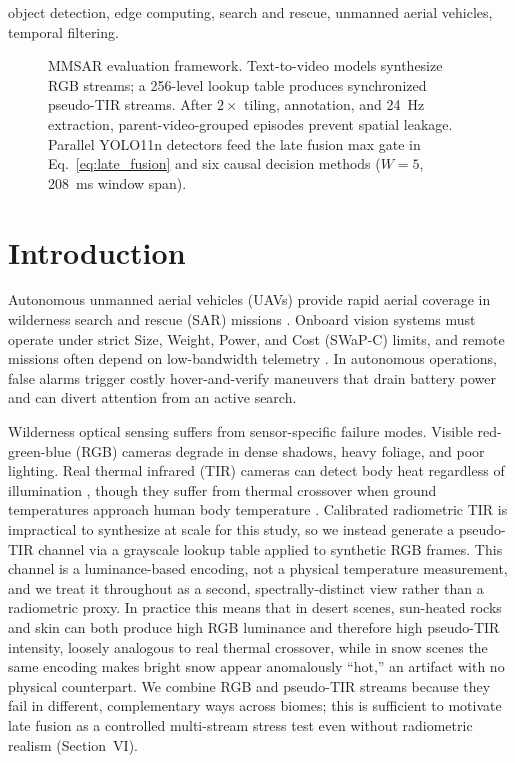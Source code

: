 \documentclass[conference]{IEEEtran}
\begin{document}
\begin{IEEEkeywords}
object detection, edge computing, search and rescue, unmanned aerial vehicles, temporal filtering.
\end{IEEEkeywords}

\begin{figure}[!t]
\centering
\resizebox{1.0\textwidth}{!}{}
\caption{MMSAR evaluation framework. Text-to-video models synthesize RGB streams; a 256-level lookup table produces synchronized pseudo-TIR streams. After $2\times$ tiling, annotation, and 24~Hz extraction, parent-video-grouped episodes prevent spatial leakage. Parallel YOLO11n detectors feed the late fusion max gate in Eq.~\eqref{eq:late_fusion} and six causal decision methods ($W=5$, 208~ms window span).}
\label{fig:system_architecture}
\end{figure}

\section{Introduction}

Autonomous unmanned aerial vehicles (UAVs) provide rapid aerial coverage in wilderness search and rescue (SAR) missions \cite{rudol2008human,silvagni2017multipurpose}. Onboard vision systems must operate under strict Size, Weight, Power, and Cost (SWaP-C) limits, and remote missions often depend on low-bandwidth telemetry \cite{kyrkou2021emergencynet}. In autonomous operations, false alarms trigger costly hover-and-verify maneuvers that drain battery power and can divert attention from an active search.

Wilderness optical sensing suffers from sensor-specific failure modes. Visible red-green-blue (RGB) cameras degrade in dense shadows, heavy foliage, and poor lighting. Real thermal infrared (TIR) cameras can detect body heat regardless of illumination \cite{hwang2015multispectral,jia2021llvip}, though they suffer from thermal crossover when ground temperatures approach human body temperature \cite{portmann2014people}. Calibrated radiometric TIR is impractical to synthesize at scale for this study, so we instead generate a pseudo-TIR channel via a grayscale lookup table applied to synthetic RGB frames. This channel is a luminance-based encoding, not a physical temperature measurement, and we treat it throughout as a second, spectrally-distinct view rather than a radiometric proxy. In practice this means that in desert scenes, sun-heated rocks and skin can both produce high RGB luminance and therefore high pseudo-TIR intensity, loosely analogous to real thermal crossover, while in snow scenes the same encoding makes bright snow appear anomalously ``hot,'' an artifact with no physical counterpart. We combine RGB and pseudo-TIR streams because they fail in different, complementary ways across biomes; this is sufficient to motivate late fusion as a controlled multi-stream stress test even without radiometric realism (Section~VI).
\end{document}
